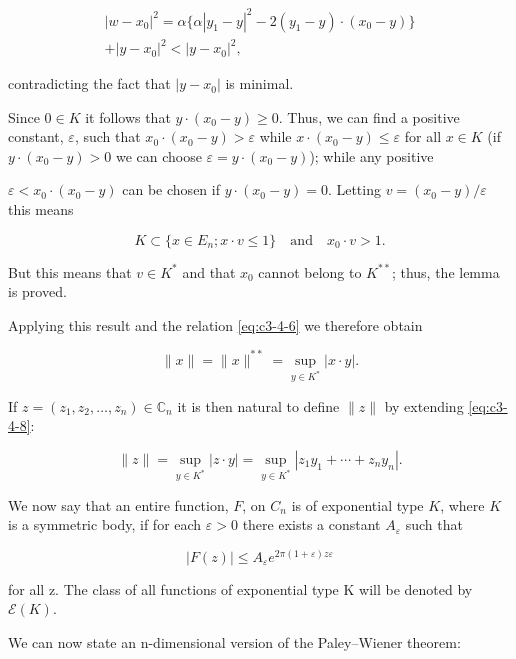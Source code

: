 \[
\begin{aligned}\left|w-x_{0}\right|^{2}=\alpha\{\alpha|y_{1}-y|^{2}-2(y_{1}-y)\cdot(x_{0}-y)\}\\ +|y-x_{0}|^{2}<|y-x_{0}|^{2},\end{aligned}
\]

contradicting the fact that $|y - x_{0}|$ is minimal.

Since $0 \in K$ it follows that $y \cdot (x_0 - y) \geq 0$. Thus, we can find a positive constant, $\varepsilon$, such that $x_0 \cdot (x_0 - y) > \varepsilon$ while $x \cdot (x_0 - y) \leq \varepsilon$ for all $x \in K$ (if $y \cdot (x_0 - y) > 0$ we can choose $\varepsilon = y \cdot (x_0 - y)$); while any positive

$\varepsilon < x_0 \cdot (x_0 - y)$ can be chosen if $y \cdot (x_0 - y) = 0$. Letting $v = (x_0 - y)/\varepsilon$ this means

\[
K\subset\{x\in E_{n};x\cdot v\leq1\}\quad\text{and}\quad x_{0}\cdot v>1.
\]

But this means that $v \in K^*$ and that $x_0$ cannot belong to $K^{**}$; thus, the lemma is proved.

Applying this result and the relation \eqref{eq:c3-4-6} we therefore obtain

\begin{equation}\label{eq:c3-4-8}
\|x\|=\|x\|^{**}=\sup_{y\in K^{*}}|x\cdot y|.
\end{equation}

If $z = (z_1, z_2, \ldots, z_n) \in \mathbb{C}_n$ it is then natural to define $\|z\|$ by extending \eqref{eq:c3-4-8}:

\begin{equation}
\tag{4.8$'$}\label{eq:c3-4-8p}
\|z\|=\sup_{y\in K^{*}}|z\cdot y|=\sup_{y\in K^{*}}|z_{1}y_{1}+\cdots+z_{n} y_{n}|.
\end{equation}

We now say that an entire function, $F$, on $C_n$ is of exponential type $K$, where $K$ is a symmetric body, if for each $\varepsilon > 0$ there exists a constant $A_\varepsilon$ such that

\[
\left|F(z)\right|\leq A_{\varepsilon}e^{2\pi(1+\varepsilon)z\varepsilon}
\]

for all z. The class of all functions of exponential type K will be denoted by $\mathcal{E}(K)$.

We can now state an n-dimensional version of the Paley--Wiener theorem:

